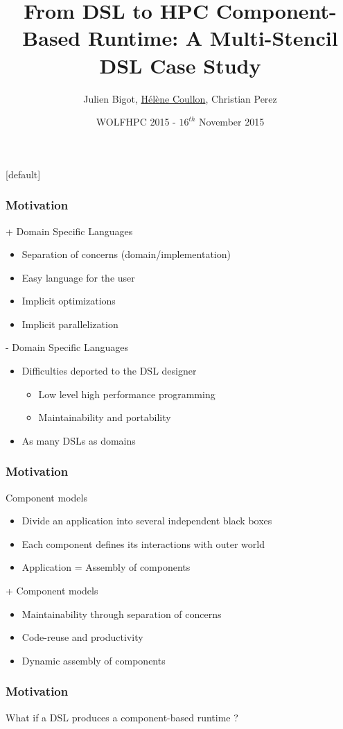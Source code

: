 \documentclass{beamer}
\title[From DSL to HPC Component-Based Runtime: A Multi-Stencil DSL Case Study]{From DSL to HPC Component-Based Runtime: A Multi-Stencil DSL Case Study}
\author[Julien Bigot (CEA), Hélène Coullon (INRIA), Christian Perez (INRIA)]{Julien Bigot, \underline{Hélène Coullon}, Christian Perez}
\institute[INRIA]{INRIA team Avalon\\Maison de la simulation (CEA)}
\date{WOLFHPC 2015 - $16^{th}$ November 2015}
\makeatletter
\newenvironment{withoutheadline}{
        \setbeamertemplate{headline}[default]
        \def\beamer@entrycode{\vspace*{-\headheight}}
    }{}
\makeatother
\begin{document}
\begin{withoutheadline}

\begin{frame}
    \titlepage
\end{frame}

\begin{frame}
\frametitle{Motivation} %
\begin{block}{+ Domain Specific Languages}
\begin{itemize}
\item Separation of concerns (domain/implementation)
\item Easy language for the user
\item Implicit optimizations
\item Implicit parallelization
\end{itemize}
\end{block}
\begin{alertblock}{- Domain Specific Languages}
\begin{itemize}
\item Difficulties deported to the DSL designer
\begin{itemize}
\item Low level high performance programming
\item Maintainability and portability
\end{itemize}
\item As many DSLs as domains
\end{itemize}
\end{alertblock}
\end{frame}
\begin{frame}
\frametitle{Motivation} %
\begin{block}{Component models}
\begin{itemize}
\item Divide an application into several independent black boxes
\item Each component defines its interactions with outer world
\item Application = Assembly of components
\end{itemize}
\end{block}
\begin{block}{+ Component models}
\begin{itemize}
\item Maintainability through separation of concerns
\item Code-reuse and productivity
\item Dynamic assembly of components
\end{itemize}
\end{block}
\end{frame}
\begin{frame}
\frametitle{Motivation} %
What if a DSL produces a component-based runtime ?


\end{frame}
\end{withoutheadline}
\end{document}

